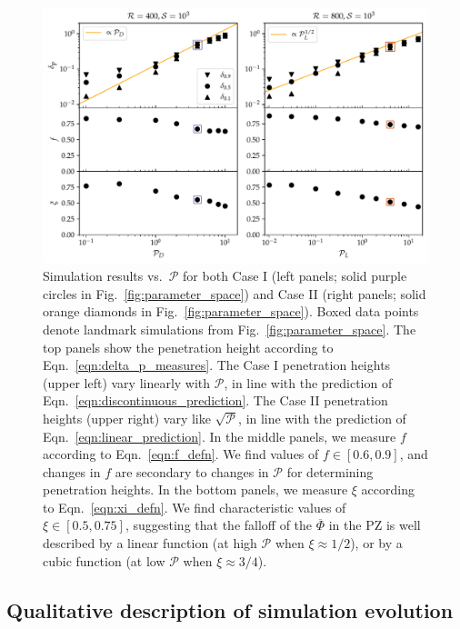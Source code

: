 \documentclass[twocolumn]{aastex631}
\newcommand{\mP}{\ensuremath{\mathcal{P}}}
\renewcommand{\bar}[1]{\overline{#1}}
\begin{document}
\begin{figure}[t]
\centering
\includegraphics[width=\textwidth]{parameters_vs_p.pdf}
\caption{
Simulation results vs.~$\mP$ for both Case I (left panels; solid purple circles in Fig.~\ref{fig:parameter_space}) and Case II (right panels; solid orange diamonds in Fig.~\ref{fig:parameter_space}).
Boxed data points denote landmark simulations from Fig.~\ref{fig:parameter_space}.
The top panels show the penetration height according to Eqn.~\ref{eqn:delta_p_measures}.
The Case I penetration heights (upper left) vary linearly with $\mP$, in line with the prediction of Eqn.~\ref{eqn:discontinuous_prediction}.
The Case II penetration heights (upper right) vary like $\sqrt{\mP}$, in line with the prediction of Eqn.~\ref{eqn:linear_prediction}.
In the middle panels, we measure $f$ according to Eqn.~\ref{eqn:f_defn}.
We find values of $f \in [0.6, 0.9]$, and changes in $f$ are secondary to changes in $\mP$ for determining penetration heights.
In the bottom panels, we measure $\xi$ according to Eqn.~\ref{eqn:xi_defn}.
We find characteristic values of $\xi \in [0.5, 0.75]$, suggesting that the falloff of the $\bar{\Phi}$ in the PZ is well described by a linear function (at high $\mP$ when $\xi \approx 1/2$), or by a cubic function (at low $\mP$ when $\xi \approx 3/4$).
\label{fig:parameters_vs_p}
}
\end{figure}


\subsection{Qualitative description of simulation evolution}
\end{document}
